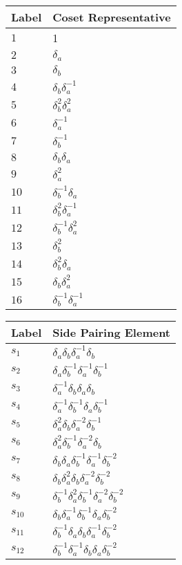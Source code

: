 \documentclass{article}
\begin{document}

\begin{center}
\begin{tabular}{ll}
\toprule
Label & Coset Representative\\
\midrule
$1$ & 1 \\
$2$ & $\delta_a^{}$ \\
$3$ & $\delta_b^{}$ \\
$4$ & $\delta_b^{}\delta_a^{-1}$ \\
$5$ & $\delta_b^{2}\delta_a^{2}$ \\
$6$ & $\delta_a^{-1}$ \\
$7$ & $\delta_b^{-1}$ \\
$8$ & $\delta_b^{}\delta_a^{}$ \\
$9$ & $\delta_a^{2}$ \\
$10$ & $\delta_b^{-1}\delta_a^{}$ \\
$11$ & $\delta_b^{2}\delta_a^{-1}$ \\
$12$ & $\delta_b^{-1}\delta_a^{2}$ \\
$13$ & $\delta_b^{2}$ \\
$14$ & $\delta_b^{2}\delta_a^{}$ \\
$15$ & $\delta_b^{}\delta_a^{2}$ \\
$16$ & $\delta_b^{-1}\delta_a^{-1}$ \\
\bottomrule
\end{tabular}
\hfill
\begin{tabular}{ll}
\toprule
Label & Side Pairing Element\\
\midrule
$s_{1}$ & $\delta_a^{}\delta_b^{}\delta_a^{-1}\delta_b^{}$ \\
$s_{2}$ & $\delta_a^{}\delta_b^{-1}\delta_a^{-1}\delta_b^{-1}$ \\
$s_{3}$ & $\delta_a^{-1}\delta_b^{}\delta_a^{}\delta_b^{}$ \\
$s_{4}$ & $\delta_a^{-1}\delta_b^{-1}\delta_a^{}\delta_b^{-1}$ \\
$s_{5}$ & $\delta_a^{2}\delta_b^{}\delta_a^{-2}\delta_b^{-1}$ \\
$s_{6}$ & $\delta_a^{2}\delta_b^{-1}\delta_a^{-2}\delta_b^{}$ \\
$s_{7}$ & $\delta_b^{}\delta_a^{}\delta_b^{-1}\delta_a^{-1}\delta_b^{-2}$ \\
$s_{8}$ & $\delta_b^{}\delta_a^{2}\delta_b^{}\delta_a^{-2}\delta_b^{-2}$ \\
$s_{9}$ & $\delta_b^{-1}\delta_a^{2}\delta_b^{-1}\delta_a^{-2}\delta_b^{-2}$ \\
$s_{10}$ & $\delta_b^{}\delta_a^{-1}\delta_b^{-1}\delta_a^{}\delta_b^{-2}$ \\
$s_{11}$ & $\delta_b^{-1}\delta_a^{}\delta_b^{}\delta_a^{-1}\delta_b^{-2}$ \\
$s_{12}$ & $\delta_b^{-1}\delta_a^{-1}\delta_b^{}\delta_a^{}\delta_b^{-2}$ \\
\bottomrule
\end{tabular}
\end{center}

\thispagestyle{empty}
\end{document}
